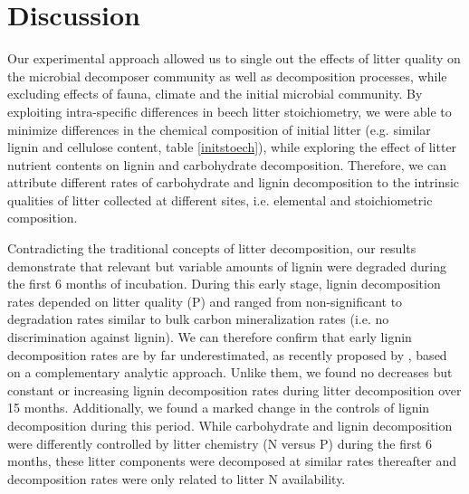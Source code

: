 \section*{Discussion}

Our experimental approach allowed us to single out the effects of litter quality on the microbial decomposer community as well as decomposition processes, while excluding effects of fauna, climate and the initial microbial community. By exploiting intra-specific differences in beech litter stoichiometry, we were able to minimize differences in the chemical composition of initial litter (e.g. similar lignin and cellulose content, table \ref{initstoech}), while exploring the effect of litter nutrient contents on lignin and carbohydrate decomposition. Therefore, we can attribute different rates of carbohydrate and lignin decomposition to the intrinsic qualities of litter collected at different sites, i.e. elemental and stoichiometric composition.

Contradicting the traditional concepts of litter decomposition, our results demonstrate that relevant but variable amounts of lignin were degraded during the first 6 months of incubation. During this early stage, lignin decomposition rates depended on litter quality (P) and ranged from non-significant to degradation rates similar to bulk carbon mineralization rates (i.e. no discrimination against lignin). We can therefore confirm that early lignin decomposition rates are by far underestimated, as recently proposed by \cite{Klotzbucher2011}, based on a complementary analytic approach. Unlike them, we found no decreases but constant or increasing lignin decomposition rates during litter decomposition over 15 months. Additionally, we found a marked change in the controls of lignin decomposition during this period. While carbohydrate and lignin decomposition were differently controlled by litter chemistry (N versus P) during the first 6 months, these litter components were decomposed at similar rates thereafter and decomposition rates were only related to litter N availability.

